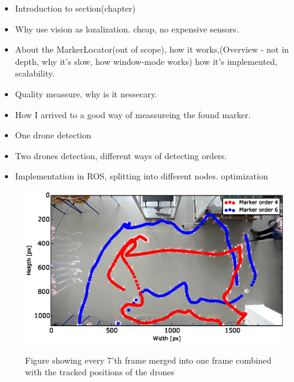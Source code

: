 \begin{itemize}
	\item Introduction to section(chapter)
	\item Why use vision as lozalization. cheap, no expensive sensors.
	\item About the MarkerLocator(out of scope), how it works,(Overview - not in depth, why it's slow, how window-mode works) how it's implemented, scalability.
	\item Quality meassure, why is it nessecary.
	\item How I arrived to a good way of meassureing the found marker.
	\item One drone detection
	\item Two drones detection, different ways of detecting orders.
	\item Implementation in ROS, splitting into different nodes.	optimization
\end{itemize}

\begin{figure}[H]
    \center
    \includegraphics[width=1\textwidth]{graphics/test.eps}
  \label{fig:boat1}
  \caption{Figure showing every 7'th frame merged into one frame combined with the tracked positions of the drones}
\end{figure}


